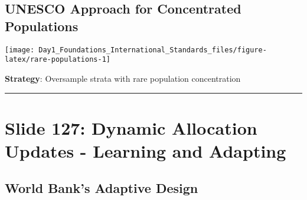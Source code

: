 \documentclass[
]{article}
\begin{document}
\subsection{UNESCO Approach for Concentrated
Populations}\label{unesco-approach-for-concentrated-populations}

\texttt{[image: Day1\_Foundations\_International\_Standards\_files/figure-latex/rare-populations-1]}

\textbf{Strategy}: Oversample strata with rare population concentration

\begin{center}\rule{0.5\linewidth}{0.5pt}\end{center}

\section{Slide 127: Dynamic Allocation Updates - Learning and
Adapting}\label{slide-127-dynamic-allocation-updates---learning-and-adapting}

\subsection{World Bank's Adaptive
Design}\label{world-banks-adaptive-design}
\end{document}
